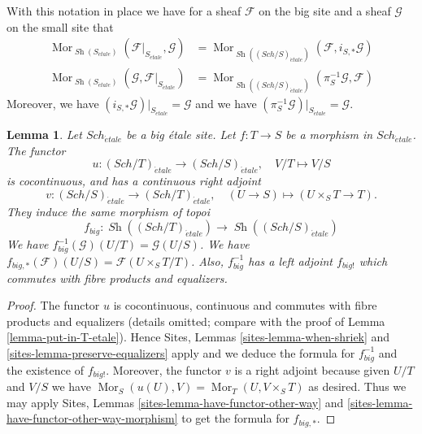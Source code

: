 \documentclass{stacks-project}
\theoremstyle{plain}
\newtheorem{lemma}[subsection]{Lemma}
\theoremstyle{definition}
\theoremstyle{remark}
\numberwithin{equation}{subsection}
\def\Sch{\mathit{Sch}}
\def\Mor{\mathop{\mathrm{Mor}}\nolimits}
\def\Sh{\mathop{\mathit{Sh}}\nolimits}
\def\etale{{\acute{e}tale}}
\begin{document}
\noindent
With this notation in place we have for a sheaf $\mathcal{F}$ on the
big site and a sheaf $\mathcal{G}$ on the small site that
\begin{align*}
\Mor_{\Sh(S_\etale)}(
\mathcal{F}|_{S_\etale},
\mathcal{G})
& =
\Mor_{\Sh((\Sch/S)_\etale)}(
\mathcal{F},
i_{S, *}\mathcal{G}) \\
\Mor_{\Sh(S_\etale)}(
\mathcal{G},
\mathcal{F}|_{S_\etale})
& =
\Mor_{\Sh((\Sch/S)_\etale)}(
\pi_S^{-1}\mathcal{G},
\mathcal{F})
\end{align*}
Moreover, we have $(i_{S, *}\mathcal{G})|_{S_\etale} = \mathcal{G}$
and we have $(\pi_S^{-1}\mathcal{G})|_{S_\etale} = \mathcal{G}$.

\begin{lemma}
\label{lemma-morphism-big-etale}
Let $\Sch_\etale$ be a big \'etale site.
Let $f : T \to S$ be a morphism in $\Sch_\etale$.
The functor
$$
u :
(\Sch/T)_\etale
\longrightarrow
(\Sch/S)_\etale,
\quad
V/T \longmapsto V/S
$$
is cocontinuous, and has a continuous right adjoint
$$
v :
(\Sch/S)_\etale
\longrightarrow
(\Sch/T)_\etale,
\quad
(U \to S) \longmapsto (U \times_S T \to T).
$$
They induce the same morphism of topoi
$$
f_{big} :
\Sh((\Sch/T)_\etale)
\longrightarrow
\Sh((\Sch/S)_\etale)
$$
We have $f_{big}^{-1}(\mathcal{G})(U/T) = \mathcal{G}(U/S)$.
We have $f_{big, *}(\mathcal{F})(U/S) = \mathcal{F}(U \times_S T/T)$.
Also, $f_{big}^{-1}$ has a left adjoint $f_{big!}$ which commutes with
fibre products and equalizers.
\end{lemma}

\begin{proof}
The functor $u$ is cocontinuous, continuous and commutes with fibre products
and equalizers (details omitted; compare with the proof of
Lemma \ref{lemma-put-in-T-etale}).
Hence
Sites, Lemmas \ref{sites-lemma-when-shriek} and
\ref{sites-lemma-preserve-equalizers}
apply and we deduce the formula
for $f_{big}^{-1}$ and the existence of $f_{big!}$. Moreover,
the functor $v$ is a right adjoint because given $U/T$ and $V/S$
we have $\Mor_S(u(U), V) = \Mor_T(U, V \times_S T)$
as desired. Thus we may apply
Sites, Lemmas \ref{sites-lemma-have-functor-other-way} and
\ref{sites-lemma-have-functor-other-way-morphism} to get the
formula for $f_{big, *}$.
\end{proof}
\end{document}
